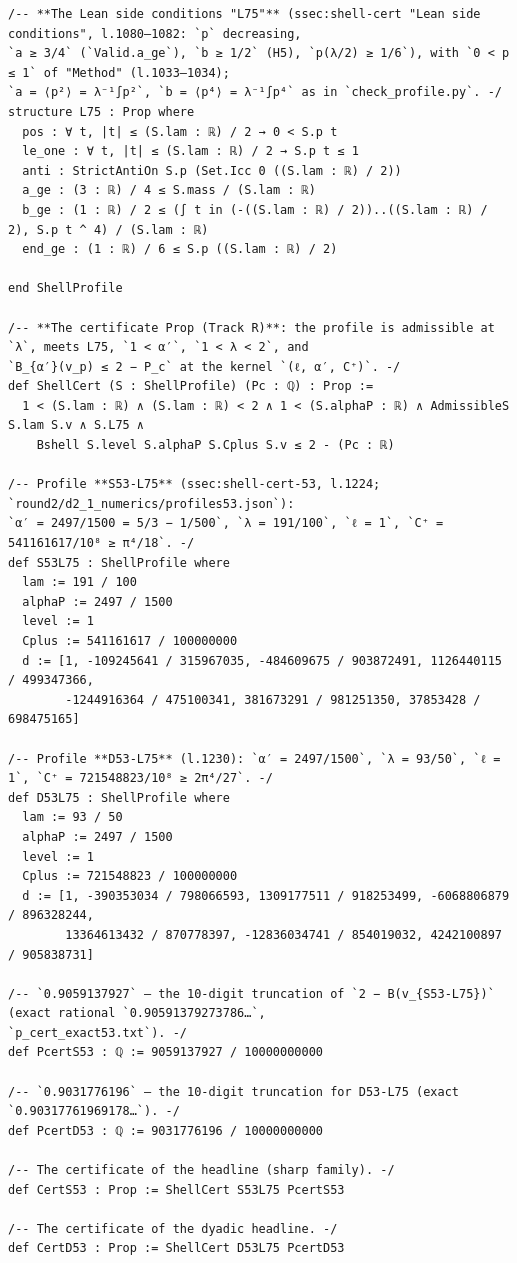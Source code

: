 \begin{Verbatim}[fontsize=\footnotesize,breaklines,frame=single,framesep=2mm]
/-- **The Lean side conditions "L75"** (ssec:shell-cert "Lean side conditions", l.1080–1082: `p` decreasing,
`a ≥ 3/4` (`Valid.a_ge`), `b ≥ 1/2` (H5), `p(λ/2) ≥ 1/6`), with `0 < p ≤ 1` of "Method" (l.1033–1034);
`a = ⟨p²⟩ = λ⁻¹∫p²`, `b = ⟨p⁴⟩ = λ⁻¹∫p⁴` as in `check_profile.py`. -/
structure L75 : Prop where
  pos : ∀ t, |t| ≤ (S.lam : ℝ) / 2 → 0 < S.p t
  le_one : ∀ t, |t| ≤ (S.lam : ℝ) / 2 → S.p t ≤ 1
  anti : StrictAntiOn S.p (Set.Icc 0 ((S.lam : ℝ) / 2))
  a_ge : (3 : ℝ) / 4 ≤ S.mass / (S.lam : ℝ)
  b_ge : (1 : ℝ) / 2 ≤ (∫ t in (-((S.lam : ℝ) / 2))..((S.lam : ℝ) / 2), S.p t ^ 4) / (S.lam : ℝ)
  end_ge : (1 : ℝ) / 6 ≤ S.p ((S.lam : ℝ) / 2)

end ShellProfile

/-- **The certificate Prop (Track R)**: the profile is admissible at `λ`, meets L75, `1 < α′`, `1 < λ < 2`, and
`B_{α′}(v_p) ≤ 2 − P_c` at the kernel `(ℓ, α′, C⁺)`. -/
def ShellCert (S : ShellProfile) (Pc : ℚ) : Prop :=
  1 < (S.lam : ℝ) ∧ (S.lam : ℝ) < 2 ∧ 1 < (S.alphaP : ℝ) ∧ AdmissibleS S.lam S.v ∧ S.L75 ∧
    Bshell S.level S.alphaP S.Cplus S.v ≤ 2 - (Pc : ℝ)

/-- Profile **S53-L75** (ssec:shell-cert-53, l.1224; `round2/d2_1_numerics/profiles53.json`):
`α′ = 2497/1500 = 5/3 − 1/500`, `λ = 191/100`, `ℓ = 1`, `C⁺ = 541161617/10⁸ ≥ π⁴/18`. -/
def S53L75 : ShellProfile where
  lam := 191 / 100
  alphaP := 2497 / 1500
  level := 1
  Cplus := 541161617 / 100000000
  d := [1, -109245641 / 315967035, -484609675 / 903872491, 1126440115 / 499347366,
        -1244916364 / 475100341, 381673291 / 981251350, 37853428 / 698475165]

/-- Profile **D53-L75** (l.1230): `α′ = 2497/1500`, `λ = 93/50`, `ℓ = 1`, `C⁺ = 721548823/10⁸ ≥ 2π⁴/27`. -/
def D53L75 : ShellProfile where
  lam := 93 / 50
  alphaP := 2497 / 1500
  level := 1
  Cplus := 721548823 / 100000000
  d := [1, -390353034 / 798066593, 1309177511 / 918253499, -6068806879 / 896328244,
        13364613432 / 870778397, -12836034741 / 854019032, 4242100897 / 905838731]

/-- `0.9059137927` — the 10-digit truncation of `2 − B(v_{S53-L75})` (exact rational `0.90591379273786…`,
`p_cert_exact53.txt`). -/
def PcertS53 : ℚ := 9059137927 / 10000000000

/-- `0.9031776196` — the 10-digit truncation for D53-L75 (exact `0.90317761969178…`). -/
def PcertD53 : ℚ := 9031776196 / 10000000000

/-- The certificate of the headline (sharp family). -/
def CertS53 : Prop := ShellCert S53L75 PcertS53

/-- The certificate of the dyadic headline. -/
def CertD53 : Prop := ShellCert D53L75 PcertD53
\end{Verbatim}
